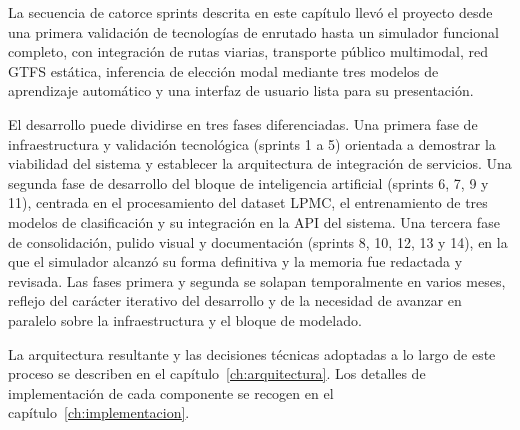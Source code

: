 La secuencia de catorce sprints descrita en este capítulo llevó el proyecto desde una primera validación de tecnologías de enrutado hasta un simulador funcional completo, con integración de rutas viarias, transporte público multimodal, red GTFS estática, inferencia de elección modal mediante tres modelos de aprendizaje automático y una interfaz de usuario lista para su presentación.

El desarrollo puede dividirse en tres fases diferenciadas. Una primera fase de infraestructura y validación tecnológica (sprints 1 a 5) orientada a demostrar la viabilidad del sistema y establecer la arquitectura de integración de servicios. Una segunda fase de desarrollo del bloque de inteligencia artificial (sprints 6, 7, 9 y 11), centrada en el procesamiento del dataset LPMC, el entrenamiento de tres modelos de clasificación y su integración en la API del sistema. Una tercera fase de consolidación, pulido visual y documentación (sprints 8, 10, 12, 13 y 14), en la que el simulador alcanzó su forma definitiva y la memoria fue redactada y revisada. Las fases primera y segunda se solapan temporalmente en varios meses, reflejo del carácter iterativo del desarrollo y de la necesidad de avanzar en paralelo sobre la infraestructura y el bloque de modelado.

La arquitectura resultante y las decisiones técnicas adoptadas a lo largo de este proceso se describen en el capítulo~\ref{ch:arquitectura}. Los detalles de implementación de cada componente se recogen en el capítulo~\ref{ch:implementacion}.
